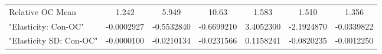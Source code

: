 \begin{tabular}{rrrrrrr}
\multicolumn{1}{l}{Relative OC Mean} & \multicolumn{1}{c}{1.242} & \multicolumn{1}{c}{5.949} & \multicolumn{1}{c}{10.63} & \multicolumn{1}{c}{1.583} & \multicolumn{1}{c}{1.510} & \multicolumn{1}{c}{1.356} \\
\multicolumn{1}{l}{"Elasticity: Con-OC"} & \multicolumn{1}{c}{-0.0002927} & \multicolumn{1}{c}{-0.5532840} & \multicolumn{1}{c}{-0.6699210} & \multicolumn{1}{c}{3.4052300} & \multicolumn{1}{c}{-2.1924870} & \multicolumn{1}{c}{-0.0339822} \\
\multicolumn{1}{l}{"Elasticity SD: Con-OC"} & \multicolumn{1}{c}{-0.0000100} & \multicolumn{1}{c}{-0.0210134} & \multicolumn{1}{c}{-0.0231566} & \multicolumn{1}{c}{0.1158241} & \multicolumn{1}{c}{-0.0820235} & \multicolumn{1}{c}{-0.0012250} \\
\bottomrule
\bottomrule
\end{tabular}%
